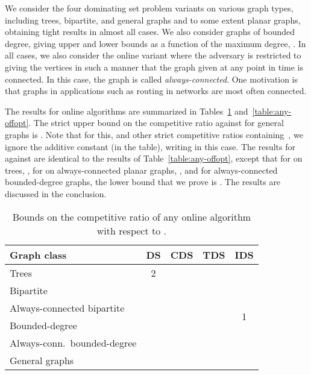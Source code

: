 We consider the four dominating set problem variants
on various graph types, including trees, bipartite, and general graphs
and to some extent planar graphs, obtaining tight results
in almost all cases.
We also consider graphs of bounded degree, giving upper and lower
bounds as a function of the maximum degree, .
In all cases, we also consider the online variant where the
adversary is restricted to giving the vertices in such a manner
that the graph given at any point in time is connected.
In this case, the graph is called {\em always-connected}.
One motivation is that graphs in applications such as routing in 
networks are most often connected.



The results for online algorithms are summarized in 
Tables~\ref{table:any-onopt} and~\ref{table:any-offopt}. The strict upper
bound on the competitive ratio against \onopt for general graphs is
. Note that for this, and other strict competitive
ratios containing~,
we ignore the additive constant (in the table), writing  in this case.
The results for \onopt against \offopt are identical to the results of
Table~\ref{table:any-offopt}, except that for \ds on trees,
, for \ds on always-connected planar graphs,
, and for always-connected bounded-degree graphs, the lower bound that we prove is .
The results are discussed in the conclusion.

\begin{table}
\begin{tabular}{|l||c|c|c|c|}
\hline
Graph class & DS & CDS & TDS & IDS \\
\hline\hline
Trees & 2 & \multicolumn{2}{c|}{} & \multirow{6}{*}{1}\\ 
\hhline{|----|~|}
Bipartite & \multicolumn{2}{c|}{\multirow{2}{*}{}} &  & \\
\hhline{|-|~~-|~|}
Always-connected bipartite & \multicolumn{2}{c|}{} &  & \\
\hhline{|----|~|}
Bounded-degree & \multirow{2}{*}{} &  &
 & \\ 
\hhline{|-|~|-|-|~|}
Always-conn.\ bounded-degree & &  &  & \\
\hhline{|-|-|-|-|~|}
General graphs & \multicolumn{3}{c|}{}  & \\
\hline
\end{tabular}
\caption{Bounds on the competitive ratio of any online algorithm
with respect to \onopt.\label{table:any-onopt}}
\end{table}

